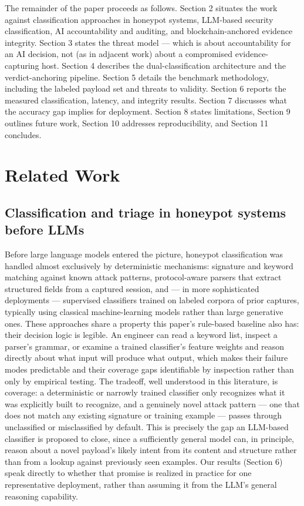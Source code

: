 \documentclass[journal,10pt,twocolumn]{IEEEtran}
\begin{document}
The remainder of the paper proceeds as follows. Section 2 situates the work against classification approaches in honeypot systems, LLM-based security classification, AI accountability and auditing, and blockchain-anchored evidence integrity. Section 3 states the threat model --- which is about accountability for an AI decision, not (as in adjacent work) about a compromised evidence-capturing host. Section 4 describes the dual-classification architecture and the verdict-anchoring pipeline. Section 5 details the benchmark methodology, including the labeled payload set and threats to validity. Section 6 reports the measured classification, latency, and integrity results. Section 7 discusses what the accuracy gap implies for deployment. Section 8 states limitations, Section 9 outlines future work, Section 10 addresses reproducibility, and Section 11 concludes.

\section{Related Work}

\subsection{Classification and triage in honeypot systems before LLMs}

Before large language models entered the picture, honeypot classification was handled almost exclusively by deterministic mechanisms: signature and keyword matching against known attack patterns, protocol-aware parsers that extract structured fields from a captured session, and --- in more sophisticated deployments --- supervised classifiers trained on labeled corpora of prior captures, typically using classical machine-learning models rather than large generative ones. These approaches share a property this paper's rule-based baseline also has: their decision logic is legible. An engineer can read a keyword list, inspect a parser's grammar, or examine a trained classifier's feature weights and reason directly about what input will produce what output, which makes their failure modes predictable and their coverage gaps identifiable by inspection rather than only by empirical testing. The tradeoff, well understood in this literature, is coverage: a deterministic or narrowly trained classifier only recognizes what it was explicitly built to recognize, and a genuinely novel attack pattern --- one that does not match any existing signature or training example --- passes through unclassified or misclassified by default. This is precisely the gap an LLM-based classifier is proposed to close, since a sufficiently general model can, in principle, reason about a novel payload's likely intent from its content and structure rather than from a lookup against previously seen examples. Our results (Section 6) speak directly to whether that promise is realized in practice for one representative deployment, rather than assuming it from the LLM's general reasoning capability.
\end{document}
